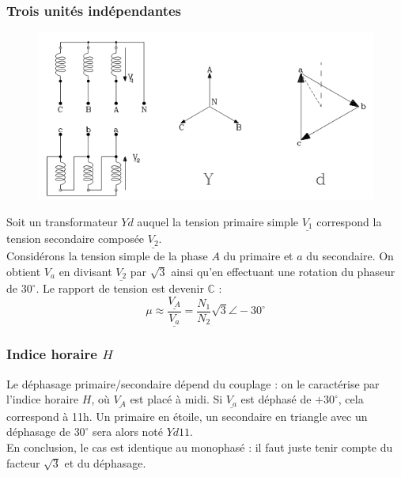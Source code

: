 		\subsubsection{Trois unités indépendantes}
		\begin{figure}
		\vspace{-8mm}
		\includegraphics[scale=0.45]{ch3/imager6.png}
		\end{figure}			
		Soit un transformateur $Yd$ auquel la tension primaire simple $\underline{V_1}$ 
		correspond la tension secondaire composée $\underline{V_2}$.\\

				Considérons la tension simple de la phase $A$ du primaire et $a$ du secondaire. 
		On obtient $V_a$ en divisant $\underline{V_2}$ par $\sqrt{3}$ ainsi qu'en 
		effectuant une rotation du phaseur de $30^\circ$. Le rapport de tension est 
		devenir $\mathbb{C}$ :
		\begin{equation}
		\mu \approx \dfrac{\underline{V_A}}{\underline{V_a}} = \dfrac{N_1}{N_2}\sqrt{3}
		\angle-30^\circ
		\end{equation}
	
		\subsubsection{Indice horaire $H$}
		Le déphasage primaire/secondaire dépend du couplage : on le caractérise par 
		l'indice horaire $H$, où $\underline{V_A}$ est placé à midi. Si $\underline{V_a}$ 
		est déphasé de $+30^\circ$, cela correspond à 11h. Un primaire en étoile, 
		un secondaire en triangle avec un déphasage de $30^\circ$ sera alors noté
		$Yd11$.\\
		
		En conclusion, le cas est identique au monophasé : il faut juste tenir compte 
		du facteur $\sqrt{3}$ et du déphasage.
	
	
	
	
	
	
	
	
	
	
	
	
	
	
	
	
	
	
	
	
	
	
